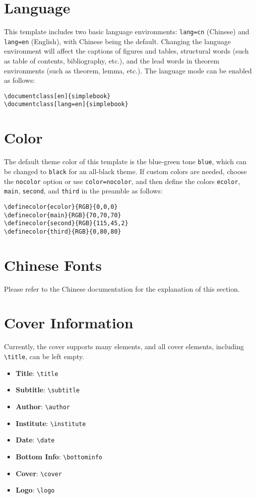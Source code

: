 \documentclass[lang=en,11pt]{../simplebook}
\begin{document}
\section{Language}
This template includes two basic language environments: \lstinline{lang=cn} (Chinese) and \lstinline{lang=en} (English),
with Chinese being the default. Changing the language environment will affect the captions of figures and tables, structural words (such as table of contents, bibliography, etc.),
and the lead words in theorem environments (such as theorem, lemma, etc.). The language mode can be enabled as follows:
\begin{lstlisting}
\documentclass[en]{simplebook}
\documentclass[lang=en]{simplebook}
\end{lstlisting}


\section{Color}

The default theme color of this template is the blue-green tone \lstinline{blue}, which can be changed to \lstinline{black} for an all-black theme.
If custom colors are needed, choose the \lstinline{nocolor} option or use \lstinline{color=nocolor},
and then define the colors \lstinline{ecolor}, \lstinline{main}, \lstinline{second}, and \lstinline{third} in the preamble as follows:
\begin{lstlisting}[tabsize=4]
\definecolor{ecolor}{RGB}{0,0,0}
\definecolor{main}{RGB}{70,70,70}
\definecolor{second}{RGB}{115,45,2}
\definecolor{third}{RGB}{0,80,80}
\end{lstlisting}

\section{Chinese Fonts}

Please refer to the Chinese documentation for the explanation of this section.


\section{Cover Information}

Currently, the cover supports many elements, and all cover elements, including \lstinline{\title}, can be left empty.

\begin{itemize}
    \item \textbf{Title}: \lstinline|\title|
    \item \textbf{Subtitle}: \lstinline|\subtitle|
    \item \textbf{Author}: \lstinline|\author|
    \item \textbf{Institute}: \lstinline|\institute|
    \item \textbf{Date}: \lstinline|\date|
    \item \textbf{Bottom Info}: \lstinline|\bottominfo|
    \item \textbf{Cover}: \lstinline|\cover|
    \item \textbf{Logo}: \lstinline|\logo|
\end{itemize}
\end{document}
